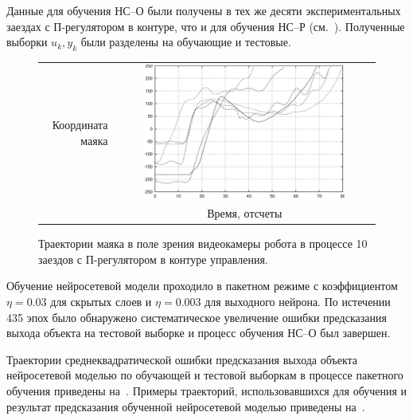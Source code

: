 Данные для обучения НС--О были получены в тех же десяти
экспериментальных заездах с П-регулятором в контуре, что и для
обучения НС--Р (см.~).  Полученные
выборки ${u_k,y_k}$ были разделены на обучающие и тестовые.

\begin{figure}
\centering
  \begin{tabular}{rc}
    \begin{sideways}
      {\hspace{3cm}\small Координата маяка}
    \end{sideways}
    &
    \includegraphics[width=0.8\textwidth,%
                     totalheight=0.35\textheight]{moby_pc_x0-9_explore}\\
    & {\small Время, отсчеты} \\
\end{tabular}
\caption{Траектории маяка в поле зрения видеокамеры робота в процессе 10
заездов с П-регулятором в контуре управления.}
\label{fig:moby_pc_x0-9_explore}
\end{figure}

Обучение нейросетевой модели проходило в пакетном режиме с
коэффициентом $\eta=0.03$ для скрытых слоев и $\eta=0.003$ для
выходного нейрона.  По истечении 435 эпох было обнаружено
систематическое увеличение ошибки предсказания выхода объекта на
тестовой выборке и процесс обучения НС--О был завершен.

Траектории среднеквадратической ошибки предсказания выхода объекта
нейросетевой моделью по обучающей и тестовой выборкам в процессе
пакетного обучения приведены на~.
Примеры траекторий, использовавшихся для обучения и результат
предсказания обученной нейросетевой моделью приведены
на~.

